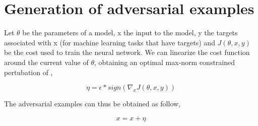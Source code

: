 \section{Generation of adversarial examples}

Let $\theta$ be the parameters of a model, x the input to the model, y the targets associated with x (for machine learning tasks that have targets) and $J(\theta, x, y)$ be the cost used to train the neural network. 
We can linearize the cost function around the current value of $\theta$, obtaining an optimal max-norm constrained pertubation of ,

$$ \eta = \epsilon * sign(\nabla_x J(\theta, x, y)) $$

The adversarial examples can thus be obtained as follow,

$$ x = x + \eta $$


